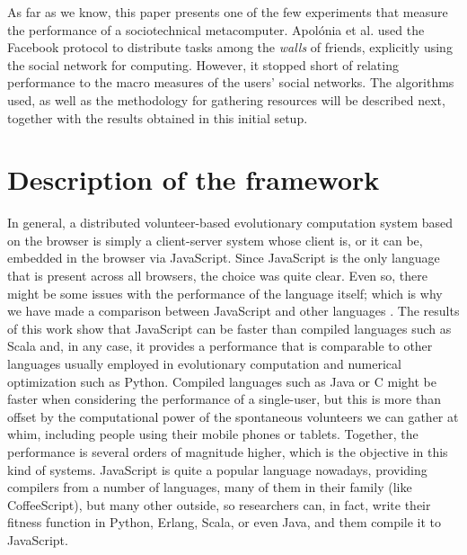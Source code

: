 \documentclass[letterpaper]{article}
\begin{document}
As far as we know, this paper presents one of the few experiments
that measure the performance of a sociotechnical
metacomputer. Apolónia et al. \citep{apolonia2012enhancing} used the
Facebook protocol to distribute tasks among the {\em walls} of
friends, explicitly using the social network for computing. However,
it stopped short of relating performance to the macro measures of the
users' social networks. 
The algorithms used, as well as the methodology 
for gathering resources will be described next, 
together with the results obtained in this initial setup.


\section{Description of the framework}
\label{sec:description}

In general, a distributed volunteer-based evolutionary computation
system based on the browser is simply a client-server system
whose client is, or it can be, embedded in the browser via
JavaScript. Since JavaScript is  the only language that is present
across all browsers, the choice was quite clear. Even so, there might
be some issues with the performance of the language itself; which %
 is
why we have made a comparison between JavaScript and other languages
\citep{2015arXiv151101088M}. The results of this work show that JavaScript can be
faster than compiled languages such as Scala and, in any case, it provides
a performance that is comparable to other languages usually employed %
in evolutionary computation and numerical optimization such as Python. 
Compiled languages such as
Java or C might be faster when %
considering the performance of a single-user, 
but this is more than offset by the computational power of
the spontaneous volunteers we can gather at whim, including people
using their mobile phones or tablets. Together, the performance is several orders of magnitude
higher, which is the objective in this kind of systems.
 JavaScript is
quite a popular language nowadays, providing compilers from a number
of languages, many of them in their family (like CoffeeScript), but
many other outside, so researchers can, in fact, write their fitness
function in Python, Erlang, Scala, or even Java, and them compile it to
JavaScript. 
\end{document}
